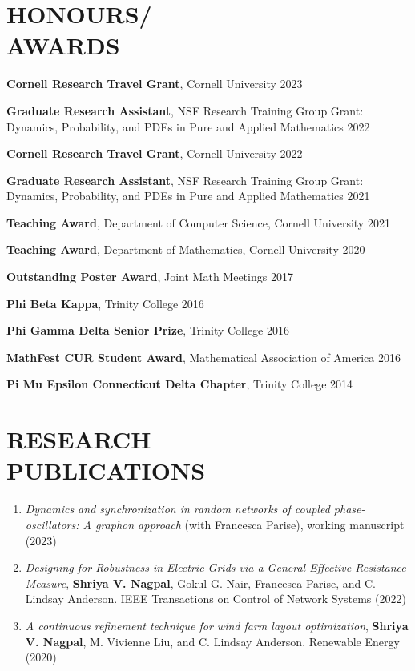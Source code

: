 \documentclass[margin]{res} %
\begin{document}
\begin{resume}
\section{HONOURS/\\AWARDS}

{\bf Cornell Research Travel Grant}, Cornell University \hfill2023 

{\bf Graduate Research Assistant}, NSF Research Training Group Grant: \\ Dynamics, Probability, and PDEs in Pure and Applied Mathematics \hfill2022 

{\bf Cornell Research Travel Grant}, Cornell University \hfill2022 

{\bf Graduate Research Assistant}, NSF Research Training Group Grant: \\ Dynamics, Probability, and PDEs in Pure and Applied Mathematics \hfill2021 

{\bf Teaching Award}, Department of Computer Science, Cornell University \hfill2021

{\bf Teaching Award}, Department of Mathematics, Cornell University \hfill2020

{\bf Outstanding Poster Award}, Joint Math Meetings \hfill2017

{\bf Phi Beta Kappa}, Trinity College \hfill2016

{\bf Phi Gamma Delta Senior Prize}, Trinity College \hfill2016

{\bf MathFest CUR Student Award}, Mathematical Association of America \hfill2016

{\bf Pi Mu Epsilon Connecticut Delta Chapter}, Trinity College \hfill2014


\section{RESEARCH\\PUBLICATIONS}
\begin{enumerate}
    \item {\sl Dynamics and synchronization in random networks of coupled phase-oscillators: A graphon approach} (with Francesca Parise), working manuscript (2023)
	
    \item {\sl Designing for Robustness in Electric Grids via a General Effective Resistance Measure}, \textbf{Shriya V. Nagpal}, Gokul G. Nair, Francesca Parise, and C. Lindsay Anderson. IEEE Transactions on Control of Network Systems (2022)
	 	
    \item {\sl A continuous refinement technique for wind farm layout optimization}, \textbf{Shriya V. Nagpal}, M. Vivienne Liu, and C. Lindsay Anderson. Renewable Energy (2020)


\end{enumerate}
\end{resume}
\end{document}
